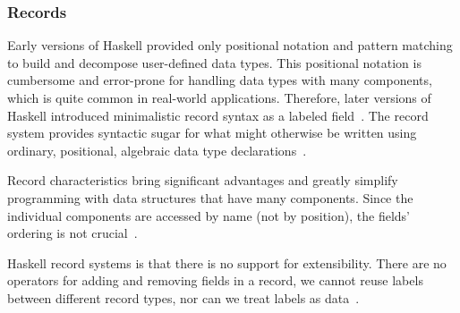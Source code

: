 \begin{frame}\frametitle{Records}
    
    Early versions of Haskell provided only positional notation and pattern matching to build and decompose user-defined data types. This positional notation is cumbersome and error-prone for handling data types with many components, which is quite common in real-world applications. Therefore, later versions of Haskell introduced minimalistic record syntax as a labeled field~\cite{lw-ext-records, history-of-haskell}.
The record system provides syntactic sugar for what might otherwise be written using ordinary, positional, algebraic data type declarations~\cite{lw-ext-records}. 


Record characteristics bring significant advantages and greatly simplify programming with data structures that have many components. Since the individual components are accessed by name (not by position), the fields' ordering is not crucial~\cite{lw-ext-records}.

Haskell record systems is that there is no support for extensibility. There are no operators for adding and removing fields in a record, we cannot reuse labels between different record types, nor can we treat labels as data~\cite{poly-ext-records, hlist,lw-ext-records}. 

\end{frame}

